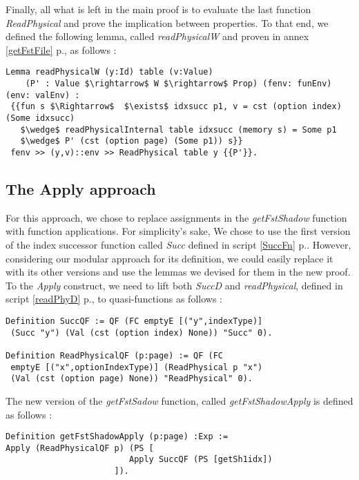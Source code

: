Finally, all what is left in the main proof is to evaluate the last function \textit{ReadPhysical} and prove the implication between properties. To that end, we defined the following lemma, called \textit{readPhysicalW} and proven in annex \ref{getFstFile} p.\pageref{getFstFile}, as follows : 
\begin{lstlisting}[caption = {readPhysicalW Lemma definition and proof}, xleftmargin=-.08\textwidth,
xrightmargin=-.08\textwidth,mathescape=true]
Lemma readPhysicalW (y:Id) table (v:Value) 
	(P' : Value $\rightarrow$ W $\rightarrow$ Prop) (fenv: funEnv) (env: valEnv) :
 {{fun s $\Rightarrow$  $\exists$ idxsucc p1, v = cst (option index) (Some idxsucc)
   $\wedge$ readPhysicalInternal table idxsucc (memory s) = Some p1 
   $\wedge$ P' (cst (option page) (Some p1)) s}} 
 fenv >> (y,v)::env >> ReadPhysical table y {{P'}}.
\end{lstlisting} \vspace{4pt}

\subsection{The Apply approach}
For this approach, we chose to replace assignments in the \textit{getFstShadow} function with function applications. For simplicity’s sake,  We chose to use the first version of the index successor function called \textit{Succ} defined in script \ref{SuccFn} p.\pageref{SuccFn}. However, considering our modular approach for its definition, we could easily replace it with its other versions and use the lemmas we devised for them in the new proof. To the \textit{Apply} construct, we need to lift both \textit{SuccD} and \textit{readPhysical}, defined in script \ref{readPhyD} p.\pageref{readPhyD}, to quasi-functions as follows :
\begin{lstlisting}[caption = {Lifting Succ and  readPhysical to quasi-functions}, mathescape=true]
Definition SuccQF := QF (FC emptyE [("y",indexType)] 
 (Succ "y") (Val (cst (option index) None)) "Succ" 0).

Definition ReadPhysicalQF (p:page) := QF (FC 
 emptyE [("x",optionIndexType)] (ReadPhysical p "x") 
 (Val (cst (option page) None)) "ReadPhysical" 0).
\end{lstlisting} \vspace{4pt}
The new version of the \textit{getFstSadow} function, called \textit{getFstShadowApply} is defined as follows :
\begin{lstlisting}[caption = {getFstShadowApply definition}, mathescape=true]
Definition getFstShadowApply (p:page) :Exp :=
Apply (ReadPhysicalQF p) (PS [
                         Apply SuccQF (PS [getSh1idx])
                      ]). 
\end{lstlisting} \vspace{4pt}

